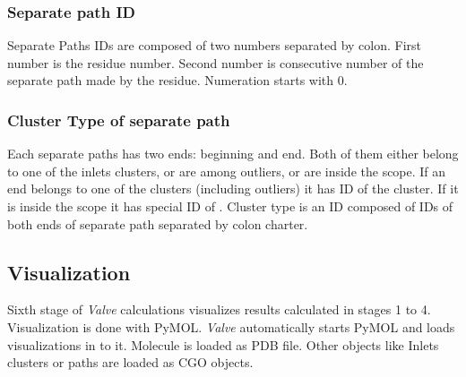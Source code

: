 \documentclass[a4paper,10pt,english]{sphinxmanual}
\begin{document}
\subsubsection{Separate path ID}
\label{valve/valve_manual:separate-path-id}
Separate Paths IDs are composed of two numbers separated by colon. First number is the residue number. Second number is consecutive number of the separate path made by the residue. Numeration starts with 0.


\subsubsection{Cluster Type of separate path}
\label{valve/valve_manual:cluster-type-of-separate-path}
Each separate paths has two ends: beginning and end. Both of them either belong to one of the inlets clusters, or are among outliers, or are inside the scope. If an end belongs to one of the clusters (including outliers) it has ID of the cluster. If it is inside the scope it has special ID of . Cluster type is an ID composed of IDs of both ends of separate path separated by colon charter.


\subsection{Visualization}
\label{valve/valve_manual:visualization}
Sixth stage of \emph{Valve} calculations visualizes results calculated in stages 1 to 4. Visualization is done with PyMOL. \emph{Valve} automatically starts PyMOL and loads visualizations in to it.
Molecule is loaded as PDB file. Other objects like Inlets clusters or paths are loaded as CGO objects.
\end{document}
